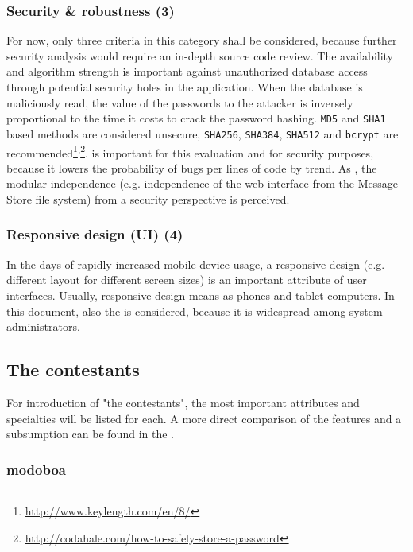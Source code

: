 \documentclass[12pt,a4paper]{scrartcl}
\begin{document}
			\subsubsection{Security \& robustness (3)}
				For now, only three criteria in this category shall be
				considered, because further security analysis would require an
				in-depth source code review. The 
				availability and algorithm strength is important against
				unauthorized database access through potential security holes
				in the application. When the database is maliciously read, the
				value of the passwords to the attacker is inversely
				proportional to the time it costs to crack the password
				hashing. \texttt{MD5} and \texttt{SHA1} based methods are
				considered unsecure, \texttt{SHA256}, \texttt{SHA384},
				\texttt{SHA512} and \texttt{bcrypt} are
				recommended\footnote{\url{http://www.keylength.com/en/8/}}\textsuperscript{,}\footnote{\url{http://codahale.com/how-to-safely-store-a-password}}.
				 is important for this evaluation and
				for security purposes, because it lowers the probability of
				bugs per lines of code by trend. As ,
				the modular independence (e.g. independence of the web
				interface from the Message Store file system) from a security
				perspective is perceived.

			\subsubsection{Responsive design (\acs{UI}) (4)}
				In the days of rapidly increased mobile device usage, a
				responsive design (e.g. different layout for different screen
				sizes) is an important attribute of user interfaces. Usually,
				responsive design means 
				as phones and tablet computers. In this document, also the
				 is considered,
				because it is widespread among system administrators.

		\subsection{The contestants}
			For introduction of "the contestants", the most important
			attributes and specialties will be listed for each. A more direct
			comparison of the features and a subsumption can be found in the
			.

			\subsubsection{modoboa}
\end{document}
